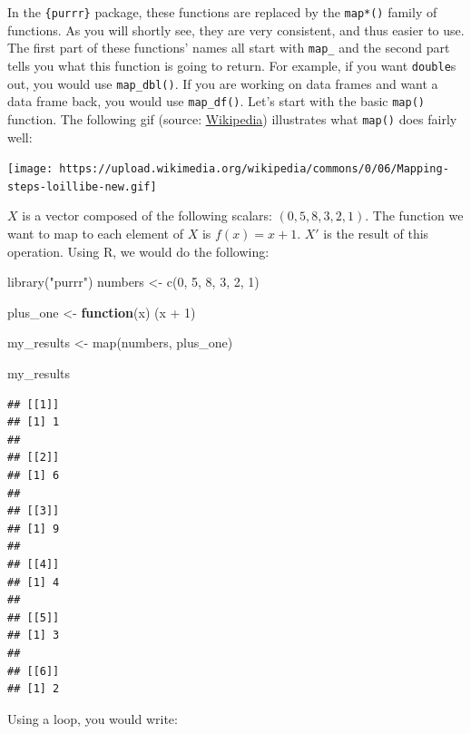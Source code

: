 \documentclass[
]{article}
\newenvironment{Shaded}{\begin{snugshade}}{\end{snugshade}}
\newcommand{\ControlFlowTok}[1]{\textcolor[rgb]{0.13,0.29,0.53}{\textbf{#1}}}
\newcommand{\DecValTok}[1]{\textcolor[rgb]{0.00,0.00,0.81}{#1}}
\newcommand{\FunctionTok}[1]{\textcolor[rgb]{0.00,0.00,0.00}{#1}}
\newcommand{\NormalTok}[1]{#1}
\newcommand{\OtherTok}[1]{\textcolor[rgb]{0.56,0.35,0.01}{#1}}
\newcommand{\SpecialCharTok}[1]{\textcolor[rgb]{0.00,0.00,0.00}{#1}}
\newcommand{\StringTok}[1]{\textcolor[rgb]{0.31,0.60,0.02}{#1}}
\begin{document}
In the \texttt{\{purrr\}} package, these functions are replaced by the \texttt{map*()} family of functions. As you will
shortly see, they are very consistent, and thus easier to use.
The first part of these functions' names all start with \texttt{map\_} and the second part tells you what
this function is going to return. For example, if you want \texttt{double}s out, you would use \texttt{map\_dbl()}.
If you are working on data frames and want a data frame back, you would use \texttt{map\_df()}. Let's start
with the basic \texttt{map()} function. The following gif
(source: \href{https://en.wikipedia.org/wiki/Map_(higher-order_function)}{Wikipedia}) illustrates
what \texttt{map()} does fairly well:

\texttt{[image: https://upload.wikimedia.org/wikipedia/commons/0/06/Mapping-steps-loillibe-new.gif]}

\(X\) is a vector composed of the following scalars: \((0, 5, 8, 3, 2, 1)\). The function we want to
map to each element of \(X\) is \(f(x) = x + 1\). \(X'\) is the result of this operation. Using R, we
would do the following:

\begin{Shaded}
\begin{Highlighting}[]
\FunctionTok{library}\NormalTok{(}\StringTok{"purrr"}\NormalTok{)}
\NormalTok{numbers }\OtherTok{\textless{}{-}} \FunctionTok{c}\NormalTok{(}\DecValTok{0}\NormalTok{, }\DecValTok{5}\NormalTok{, }\DecValTok{8}\NormalTok{, }\DecValTok{3}\NormalTok{, }\DecValTok{2}\NormalTok{, }\DecValTok{1}\NormalTok{)}

\NormalTok{plus\_one }\OtherTok{\textless{}{-}} \ControlFlowTok{function}\NormalTok{(x) (x }\SpecialCharTok{+} \DecValTok{1}\NormalTok{)}

\NormalTok{my\_results }\OtherTok{\textless{}{-}} \FunctionTok{map}\NormalTok{(numbers, plus\_one)}

\NormalTok{my\_results}
\end{Highlighting}
\end{Shaded}

\begin{verbatim}
## [[1]]
## [1] 1
## 
## [[2]]
## [1] 6
## 
## [[3]]
## [1] 9
## 
## [[4]]
## [1] 4
## 
## [[5]]
## [1] 3
## 
## [[6]]
## [1] 2
\end{verbatim}

Using a loop, you would write:
\end{document}
